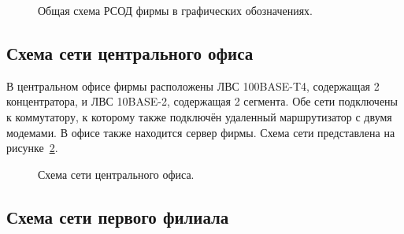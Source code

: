 \begin{figure}[h]
\caption{Общая схема РСОД фирмы в графических обозначениях.}
\label{pic:3_2}
\end{figure}

\newpage

\subsection{Схема сети центрального офиса}

В центральном офисе фирмы расположены ЛВС 100BASE-T4, содержащая 2 концентратора, и ЛВС 10BASE-2, содержащая 2 сегмента. Обе сети подключены к коммутатору, к которому также подключён удаленный маршрутизатор с двумя модемами. В офисе также находится сервер фирмы. Схема сети представлена на рисунке~\ref{pic:3_3}.

\begin{figure}[h]
\caption{Схема сети центрального офиса.}
\label{pic:3_3}
\end{figure}

\newpage

\subsection{Схема сети первого филиала}

